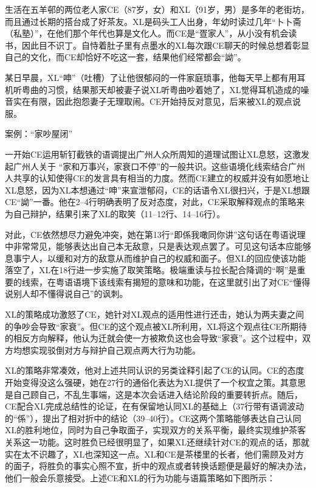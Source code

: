 \documentclass[b5paper,10.5pt,onecolumn,twoside,leqno,UTF8]{article}
\begin{document}
生活在五羊邨的两位老人家CE（87岁，女）和XL（91岁，男）是多年的老街坊，而且通过长期的搭台成了好茶友。XL是码头工人出身，年幼时读过几年“卜卜斋（私塾）”，在他们那个年代也算是文化人。而CE是“疍家人”，从小没有机会读书，因此目不识丁。自恃着肚子里有点墨水的XL每次跟CE聊天的时候总想着彰显自己的文化，而CE却恰好不吃这一套，结果他们经常都会“詏”。

某日早晨，XL“呻”（吐槽）了让他很郁闷的一件家庭琐事，他每天早上都有用耳机听粤曲的习惯，结果那天却被妻子说XL听粤曲吵着她了，XL觉得耳机造成的噪音实在有限，因此抱怨妻子无理取闹。CE开始持反对意见，后来被XL的观点说服。

\begin{table}[h!]
\caption{案例：“家吵屋闭”}

\end{table}

一开始CE运用斩钉截铁的语调提出广州人众所周知的道理试图让XL息怒，这激发起广州人关于 “家和万事兴，家衰口不停”的一般共识。这些语境化线索结合广州人共享的认知使得CE的发言具有相当的力度。然而CE建立的权威并没有如愿地让XL息怒，因为XL本想通过“呻”来宣泄郁闷，CE的话语令XL很扫兴，于是XL想跟CE“詏”一番。他在2--4行明确表明了反对态度，对此，CE采取解释观点的策略来为自己辩护，结果引来了XL的取笑（11--12行、14--16行）。

对此，CE依然想尽力避免冲突，她在第13行“即係我噉同你讲”这句话在粤语说理中非常常见，能够表达出自己本无敌意，只是表达观点罢了。可见这句话本应能够息事宁人，以缓和对方的敌意从而维护自己的权威和面子。但XL的回应使该功能落空了，XL在18行进一步实施了取笑策略。极端重读与拉长配合降调的“啊”是重要的线索，在粤语语境下该线索有揭短的意味和功能，在这里就引出了对CE“懂得说别人却不懂得说自己”的讽刺。

XL的策略成功激怒了CE，她针对XL观点的适用性进行还击，她认为两夫妻之间的争吵会导致“家衰”。但CE的这个观点被XL所利用，XL将这个观点往CE所期待的相反方向解释，他认为迁就会使一方被欺负这也会导致“家衰”。这个过程中，双方均想实现驳倒对方与辩护自己观点两大行为功能。

XL的策略非常凑效，他对上述共同认识的另类诠释引起了CE的认同。CE的态度开始变得没这么强硬，她在27行的通俗化表达为XL提供了一个权宜之策。其意思是自己顾自己，不乱生事端，这是本次会话进入结论阶段的重要转折点。随后，CE配合XL完成总结性的论证，在有保留地认同XL的基础上（37行带有语调波动的“係”），提出了相对折中的结论（39--40行）。CE这两个策略能够表达自己认同XL的胜利地位，同时为自己争取面子，实现双方的关系平衡，最终实现维护茶客关系这一功能。这时胜负已经很明显了，如果XL还继续针对CE的观点的话，那就实在太不识趣了，XL也深知这一点。XL和CE是茶楼里的长者，他们需顾及对方的面子，将胜负的事实心照不宣，折中的观点或者转换话题便是最好的解决办法，他们一般会乐意接受。上述CE和XL的行为功能与语篇策略如下图所示：
\end{document}

